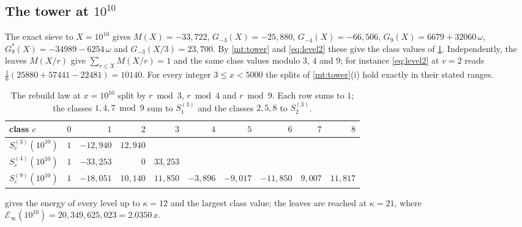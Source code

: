 \documentclass[11pt]{article}
\theoremstyle{definition}\newtheorem{definition}[theorem]{Definition}
\theoremstyle{remark}\newtheorem{remark}[theorem]{Remark}
\theoremstyle{definition}\newtheorem{axiom}{Axiom}
\begin{document}
\subsection{The tower at \texorpdfstring{$10^{10}$}{10\textasciicircum10}}

The exact sieve to $X=10^{10}$ gives $M(X)=-33{,}722$, $G_{-3}(X)=-25{,}880$, $G_{-4}(X)=-66{,}506$, $G_9(X)=6679+32060\,\omega$, $G_9^*(X)=-34989-6254\,\omega$ and $G_{-3}(X/3)=23{,}700$. By \cref{mt:tower} and \eqref{eq:level2} these give the class values of \cref{tab:classes}. Independently, the leaves $M(X/r)$ give $\sum_{r\le X}M(X/r)=1$ and the same class values modulo $3$, $4$ and $9$; for instance \eqref{eq:level2} at $v=2$ reads $\frac16(25880+57441-22481)=10140$. For every integer $3\le x<5000$ the splits of \cref{mt:tower}(i) hold exactly in their stated ranges.

\begin{table}[!htbp]\centering\small
\begin{tabular}{@{}lrrrrrrrrr@{}}\toprule
class $c$ & $0$ & $1$ & $2$ & $3$ & $4$ & $5$ & $6$ & $7$ & $8$\\\midrule
$S^{(3)}_c(10^{10})$ & $1$ & $-12{,}940$ & $12{,}940$ &&&&&&\\
$S^{(4)}_c(10^{10})$ & $1$ & $-33{,}253$ & $0$ & $33{,}253$ &&&&&\\
$S^{(9)}_c(10^{10})$ & $1$ & $-18{,}051$ & $10{,}140$ & $11{,}850$ & $-3{,}896$ & $-9{,}017$ & $-11{,}850$ & $9{,}007$ & $11{,}817$\\\bottomrule
\end{tabular}
\caption{The rebuild law at $x=10^{10}$ split by $r\bmod3$, $r\bmod4$ and $r\bmod9$. Each row sums to $1$; the classes $1,4,7\bmod9$ sum to $S^{(3)}_1$ and the classes $2,5,8$ to $S^{(3)}_2$.}\label{tab:classes}
\end{table}

 gives the energy of every level up to $\kappa=12$ and the largest class value; the leaves are reached at $\kappa=21$, where $\mathcal E_\infty(10^{10})=20{,}349{,}625{,}023=2.0350\,x$.
\end{document}
